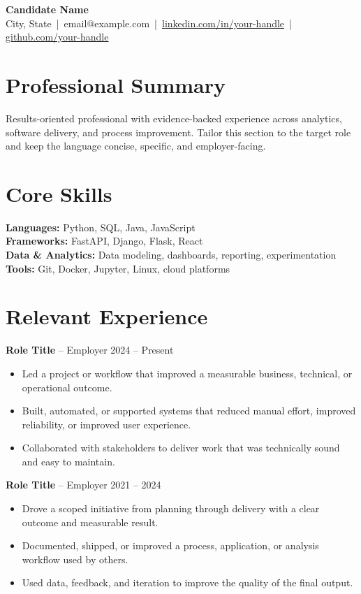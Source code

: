 \documentclass[11pt]{article}
\begin{document}
\begin{center}
    {\LARGE \textbf{Candidate Name}}\\[2pt]
    City, State \,|\, email@example.com \,|\, \href{https://linkedin.com/in/your-handle}{linkedin.com/in/your-handle} \,|\, \href{https://github.com/your-handle}{github.com/your-handle}
\end{center}

\section*{Professional Summary}
Results-oriented professional with evidence-backed experience across analytics, software delivery, and process improvement. Tailor this section to the target role and keep the language concise, specific, and employer-facing.

\section*{Core Skills}
\textbf{Languages:} Python, SQL, Java, JavaScript \\
\textbf{Frameworks:} FastAPI, Django, Flask, React \\
\textbf{Data \& Analytics:} Data modeling, dashboards, reporting, experimentation \\
\textbf{Tools:} Git, Docker, Jupyter, Linux, cloud platforms

\section*{Relevant Experience}
\textbf{Role Title} -- Employer \hfill 2024 -- Present \\
\begin{itemize}[leftmargin=1.5em, topsep=2pt, itemsep=1pt]
    \item Led a project or workflow that improved a measurable business, technical, or operational outcome.
    \item Built, automated, or supported systems that reduced manual effort, improved reliability, or improved user experience.
    \item Collaborated with stakeholders to deliver work that was technically sound and easy to maintain.
\end{itemize}

\textbf{Role Title} -- Employer \hfill 2021 -- 2024 \\
\begin{itemize}[leftmargin=1.5em, topsep=2pt, itemsep=1pt]
    \item Drove a scoped initiative from planning through delivery with a clear outcome and measurable result.
    \item Documented, shipped, or improved a process, application, or analysis workflow used by others.
    \item Used data, feedback, and iteration to improve the quality of the final output.
\end{itemize}
\end{document}
